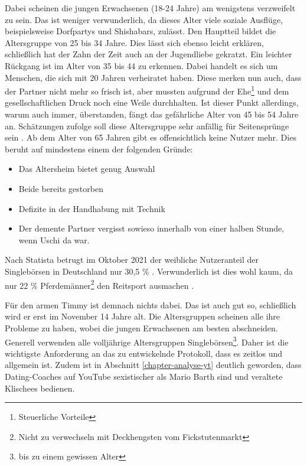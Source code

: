 Dabei scheinen die jungen Erwachsenen (18-24 Jahre) am wenigstens verzweifelt zu sein.
Das ist weniger verwunderlich, da dieses Alter viele soziale Ausflüge, beispielsweise Dorfpartys und Shishabars, zulässt.
Den Hauptteil bildet die Altersgruppe von 25 bis 34 Jahre.
Dies lässt sich ebenso leicht erklären, schließlich hat der Zahn der Zeit auch an der Jugendliebe gekratzt.
Ein leichter Rückgang ist im Alter von 35 bis 44 zu erkennen.
Dabei handelt es sich um Menschen, die sich mit 20 Jahren verheiratet haben.
Diese merken nun auch, dass der Partner nicht mehr so frisch ist, aber mussten aufgrund der Ehe\footnote{Steuerliche Vorteile} und dem gesellschaftlichen Druck noch eine Weile durchhalten.
Ist dieser Punkt allerdings, warum auch immer, überstanden, fängt das gefährliche Alter von 45 bis 54 Jahre an.
Schätzungen zufolge soll diese Altersgruppe sehr anfällig für Seitensprünge sein \cite{seitensprung}.
Ab dem Alter von 65 Jahren gibt es offensichtlich keine Nutzer mehr.
Dies beruht auf mindestens einem der folgenden Gründe:
\begin{itemize}
    \item Das Altersheim bietet genug Auswahl
    \item Beide bereits gestorben
    \item Defizite in der Handhabung mit Technik
    \item Der demente Partner vergisst sowieso innerhalb von einer halben Stunde, wenn Uschi da war.
\end{itemize} 
Nach Statista betrugt im Oktober 2021 der weibliche Nutzeranteil der Singlebörsen in Deutschland nur 30,5 \% \cite{statista}.
Verwunderlich ist dies wohl kaum, da nur 22 \% Pferdemänner\footnote{Nicht zu verwechseln mit Deckhengsten vom Fickstutenmarkt} den Reitsport ausmachen \cite{bliemel}.

Für den armen Timmy ist demnach nichts dabei.
Das ist auch gut so, schließlich wird er erst im November 14 Jahre alt.
Die Altersgruppen scheinen alle ihre Probleme zu haben, wobei die jungen Erwachsenen am besten abschneiden.
Generell verwenden alle volljährige Altersgruppen Singlebörsen\footnote{bis zu einem gewissen Alter}. 
Daher ist die wichtigste Anforderung an das zu entwickelnde Protokoll, dass es zeitlos und allgemein ist.
Zudem ist in Abschnitt \ref{chapter-analyse-yt} deutlich geworden, dass Dating-Coaches auf YouTube sexistischer als Mario Barth sind und veraltete Klischees bedienen.